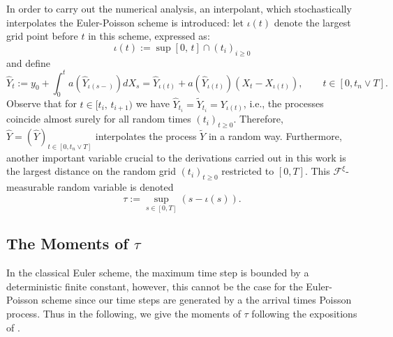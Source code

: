 In order to carry out the numerical analysis, an interpolant, which stochastically interpolates the Euler-Poisson scheme is introduced: let $\iota(t)$ denote the largest grid point before $t$ in this scheme, expressed as:
\begin{equation*}
\iota(t) := \sup[0, \, t] \cap (t_{i})_{i \geq 0}
\end{equation*}
and define 
\begin{equation}\label{eq7}
\hat{Y}_{t} := y_0 + \int^t_{0} a(\hat{Y}_{\iota(s-)})dX_s = \hat{Y}_{\iota(t)} + a(\hat{Y}_{\iota(t)})(X_t - X_{\iota(t)}), \qquad t \in [0, t_n \lor T].
\end{equation}
Observe that for $t \in [t_i, \, t_{i+1})$ we have $\hat{Y}_{t_i}= \tilde{Y}_{t_i} = Y_{\iota(t)}$, i.e., the processes coincide almost surely for all random times $(t_{i})_{t \geq 0}$. Therefore, $ \hat{Y} = (\hat{Y})_{t \in [0, t_n \lor T]} $ interpolates the process $\tilde{Y}$ in a random way. Furthermore, another important variable crucial to the derivations carried out in this work is the largest distance on the random grid $(t_{i})_{t \geq 0}$ restricted to $[0, T]$. This $\mathcal{F}^{\xi}$-measurable random variable is denoted 
\begin{equation}\label{eq8}
\tau := \sup_{s \in [0, T] } (s - \iota (s)).
\end{equation}
\subsection{ The Moments of $\tau$}
In the classical Euler scheme, the maximum time step is bounded by a deterministic finite constant, however, this cannot be the case for the Euler-Poisson scheme since our time steps are generated by a the arrival times Poisson process. Thus in the following, we give the moments of $\tau$ following the expositions of . 

